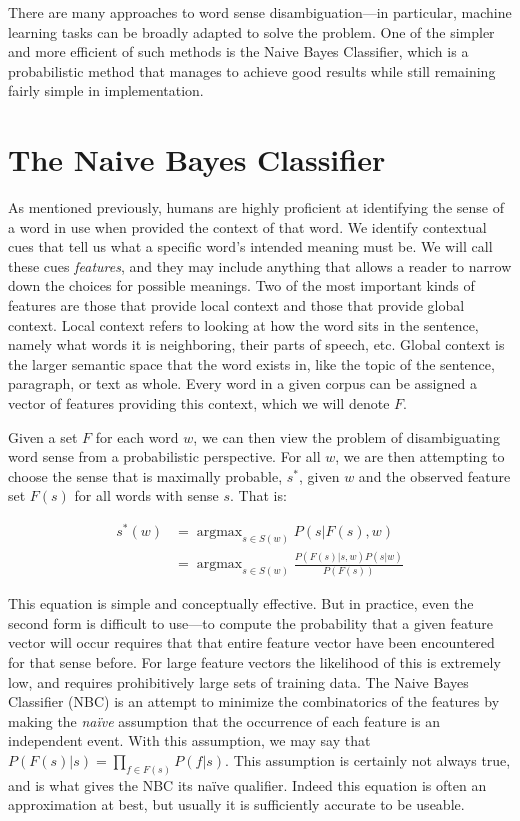 \documentclass[11pt]{article}
\DeclareMathOperator*{\argmax}{argmax}
\begin{document}
There are many approaches to word sense disambiguation---in particular, machine learning tasks can be broadly adapted to solve the problem. One of the simpler and more efficient of such methods is the Naive Bayes Classifier, which is a probabilistic method that manages to achieve good results while still remaining fairly simple in implementation.

\section{The Naive Bayes Classifier}
As mentioned previously, humans are highly proficient at identifying the sense of a word in use when provided the context of that word. We identify contextual cues that tell us what a specific word's intended meaning must be. We will call these cues \emph{features}, and they may include anything that allows a reader to narrow down the choices for possible meanings. Two of the most important kinds of features are those that provide local context and those that provide global context. Local context refers to looking at how the word sits in the sentence, namely what words it is neighboring, their parts of speech, etc. Global context is the larger semantic space that the word exists in, like the topic of the sentence, paragraph, or text as whole. Every word in a given corpus can be assigned a vector of features providing this context, which we will denote $F$.

Given a set $F$ for each word $w$, we can then view the problem of disambiguating word sense from a probabilistic perspective. For all $w$, we are then attempting to choose the sense that is maximally probable, $s^*$, given $w$ and the observed feature set $F(s)$ for all words with sense $s$. That is:

\begin{equation} \label{eq:fundamental}
\begin{split}
s^*(w) &= \argmax_{s \in S(w)} P(s|F(s), w) \\
       &= \argmax_{s \in S(w)} \frac{P(F(s)|s,w)P(s|w)}{P(F(s))}
\end{split}
\end{equation}

This equation is simple and conceptually effective. But in practice, even the second form is difficult to use---to compute the probability that a given feature vector will occur requires that that entire feature vector have been encountered for that sense before. For large feature vectors the likelihood of this is extremely low, and requires prohibitively large sets of training data. The Naive Bayes Classifier (NBC) is an attempt to minimize the combinatorics of the features by making the \emph{na\"ive} assumption that the occurrence of each feature is an independent event. With this assumption, we may say that ${P(F(s)|s) = \prod_{f \in F(s)} P(f|s)}$. This assumption is certainly not always true, and is what gives the NBC its na\"ive qualifier. Indeed this equation is often an approximation at best, but usually it is sufficiently accurate to be useable.
\end{document}
